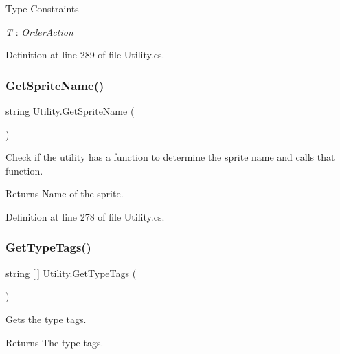 \begin{Desc}
\item[Type Constraints]\begin{description}
\item[{\em T} : {\em Order\+Action}]\end{description}
\end{Desc}


Definition at line 289 of file Utility.\+cs.

\mbox{\label{class_utility_ae8719e73fda166b35ddec2b93a6a336f}} 
\subsubsection{\texorpdfstring{Get\+Sprite\+Name()}{GetSpriteName()}}
{\footnotesize\ttfamily string Utility.\+Get\+Sprite\+Name (\begin{DoxyParamCaption}{ }\end{DoxyParamCaption})}



Check if the utility has a function to determine the sprite name and calls that function. 

\begin{DoxyReturn}{Returns}
Name of the sprite.
\end{DoxyReturn}


Definition at line 278 of file Utility.\+cs.

\mbox{\label{class_utility_afd1291684c20135877fc55e4bb261199}} 
\subsubsection{\texorpdfstring{Get\+Type\+Tags()}{GetTypeTags()}}
{\footnotesize\ttfamily string \mbox{[}$\,$\mbox{]} Utility.\+Get\+Type\+Tags (\begin{DoxyParamCaption}{ }\end{DoxyParamCaption})}



Gets the type tags. 

\begin{DoxyReturn}{Returns}
The type tags.
\end{DoxyReturn}


